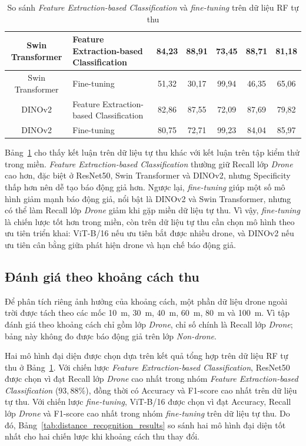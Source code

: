 \documentclass[../DoAn.tex]{subfiles}
\begin{document}
\begin{table}[H]
{\begin{tabular}{|c|p{}|c|c|c|c|c|}
        Swin Transformer & Feature Extraction-based Classification & 84,23 & 88,91 & 73,45 & 88,71 & 81,18 \\ \hline
        Swin Transformer & Fine-tuning & 51,32 & 30,17 & 99,94 & 46,35 & 65,06 \\ \hline
        DINOv2 & Feature Extraction-based Classification & 82,86 & 87,55 & 72,09 & 87,69 & 79,82 \\ \hline
        DINOv2 & Fine-tuning & 80,75 & 72,71 & 99,23 & 84,04 & 85,97 \\ \hline
    \end{tabular}
    }
    \caption{So sánh \textit{Feature Extraction-based Classification} và \textit{fine-tuning} trên dữ liệu RF tự thu}
    \label{tab:fe_ft_self_comparison}
\end{table}

Bảng~\ref{tab:fe_ft_self_comparison} cho thấy kết luận trên dữ liệu tự thu khác với kết luận trên tập kiểm thử trong miền. \textit{Feature Extraction-based Classification} thường giữ Recall lớp \textit{Drone} cao hơn, đặc biệt ở ResNet50, Swin Transformer và DINOv2, nhưng Specificity thấp hơn nên dễ tạo báo động giả hơn. Ngược lại, \textit{fine-tuning} giúp một số mô hình giảm mạnh báo động giả, nổi bật là DINOv2 và Swin Transformer, nhưng có thể làm Recall lớp \textit{Drone} giảm khi gặp miền dữ liệu tự thu. Vì vậy, \textit{fine-tuning} là chiến lược tốt hơn trong miền, còn trên dữ liệu tự thu cần chọn mô hình theo ưu tiên triển khai: ViT-B/16 nếu ưu tiên bắt được nhiều drone, và DINOv2 nếu ưu tiên cân bằng giữa phát hiện drone và hạn chế báo động giả.

\subsection{Đánh giá theo khoảng cách thu}

Để phân tích riêng ảnh hưởng của khoảng cách, một phần dữ liệu drone ngoài trời được tách theo các mốc 10~m, 30~m, 40~m, 60~m, 80~m và 100~m. Vì tập đánh giá theo khoảng cách chỉ gồm lớp \textit{Drone}, chỉ số chính là Recall lớp \textit{Drone}; bảng này không đo được báo động giả trên lớp \textit{Non-drone}.

Hai mô hình đại diện được chọn dựa trên kết quả tổng hợp trên dữ liệu RF tự thu ở Bảng~\ref{tab:fe_ft_self_comparison}. Với chiến lược \textit{Feature Extraction-based Classification}, ResNet50 được chọn vì đạt Recall lớp \textit{Drone} cao nhất trong nhóm \textit{Feature Extraction-based Classification} ($93{,}88\%$), đồng thời có Accuracy và F1-score cao nhất trên dữ liệu tự thu. Với chiến lược \textit{fine-tuning}, ViT-B/16 được chọn vì đạt Accuracy, Recall lớp \textit{Drone} và F1-score cao nhất trong nhóm \textit{fine-tuning} trên dữ liệu tự thu. Do đó, Bảng~\ref{tab:distance_recognition_results} so sánh hai mô hình đại diện tốt nhất cho hai chiến lược khi khoảng cách thu thay đổi.
\end{document}
